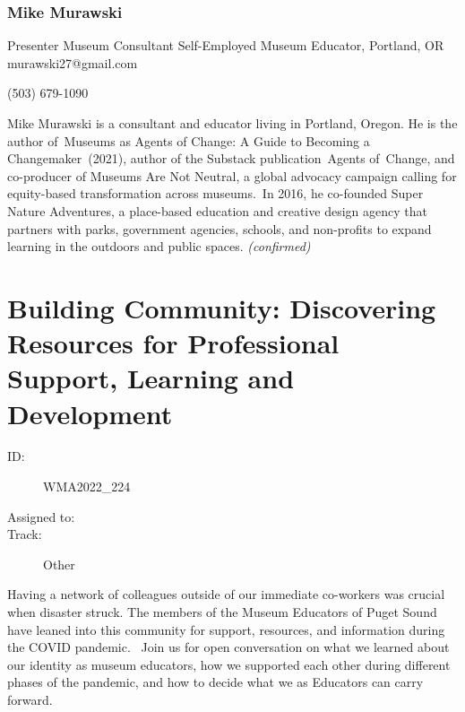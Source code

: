 \documentclass{report}
\begin{document}
              
                \subsubsection*{ Mike Murawski }
                Presenter\newline
                Museum Consultant\newline
                Self-Employed Museum Educator, Portland, OR
                \newline
                murawski27@gmail.com\newline
                
                (503) 679-1090\newline

                Mike Murawski is a consultant and educator living in Portland, Oregon. He is the author of Museums as Agents of Change: A Guide to Becoming a Changemaker (2021), author of the Substack publication Agents of Change, and co-producer of Museums Are Not Neutral, a global advocacy campaign calling for equity-based transformation across museums. In 2016, he co-founded Super Nature Adventures, a place-based education and creative design agency that partners with parks, government agencies, schools, and non-profits to expand learning in the outdoors and public spaces.
                \emph{ (confirmed) }
              
        
          \newpage
          \section{ Building Community: Discovering Resources for Professional Support, Learning and Development  }
            \begin{description}
              \item [ID:]
              WMA2022\_224

              \item [Assigned to:]
                \item [Track:]Other~
              \end{description}

              Having a network of colleagues outside of our immediate co-workers was crucial when disaster struck. The members of the Museum Educators of Puget Sound have leaned into this community for support, resources, and information during the COVID pandemic. 
Join us for open conversation on what we learned about our identity as museum educators, how we supported each other during different phases of the pandemic, and how to decide what we as Educators can carry forward. 
\end{document}
